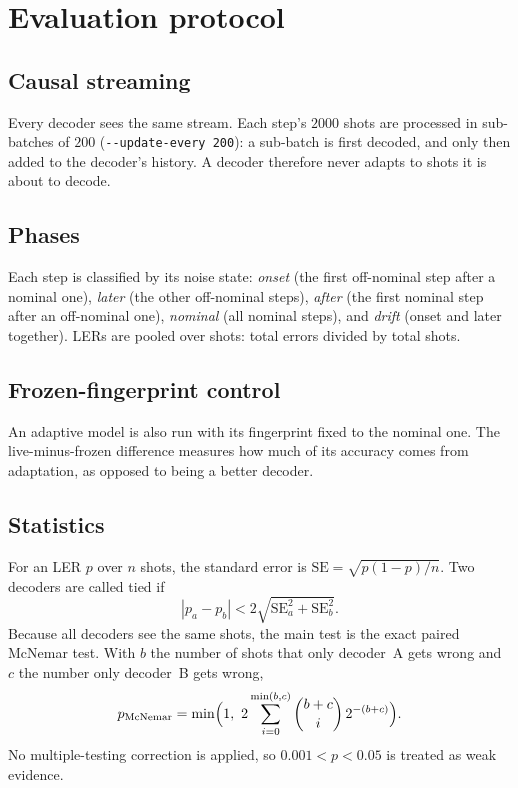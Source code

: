 \documentclass[11pt,a4paper]{article}
\newcommand{\code}[1]{\texttt{#1}}
\begin{document}
\section{Evaluation protocol}\label{sec:eval}

\subsection{Causal streaming}
Every decoder sees the same stream. Each step's $2000$ shots are processed in sub-batches of $200$
(\code{-{}-update-every 200}): a sub-batch is first decoded, and only then added to the decoder's history.
A decoder therefore never adapts to shots it is about to decode.

\subsection{Phases}
Each step is classified by its noise state:
\emph{onset} (the first off-nominal step after a nominal one),
\emph{later} (the other off-nominal steps),
\emph{after} (the first nominal step after an off-nominal one),
\emph{nominal} (all nominal steps), and
\emph{drift} (onset and later together). LERs are pooled over shots: total errors divided by total shots.

\subsection{Frozen-fingerprint control}
An adaptive model is also run with its fingerprint fixed to the nominal one. The live-minus-frozen difference
measures how much of its accuracy comes from adaptation, as opposed to being a better decoder.

\subsection{Statistics}
For an LER $p$ over $n$ shots, the standard error is $\mathrm{SE} = \sqrt{p(1-p)/n}$.
Two decoders are called tied if
\begin{equation}
  |p_a - p_b| < 2\sqrt{\mathrm{SE}_a^2 + \mathrm{SE}_b^2}.
\end{equation}
Because all decoders see the same shots, the main test is the exact paired McNemar test. With $b$ the number of
shots that only decoder~A gets wrong and $c$ the number only decoder~B gets wrong,
\begin{equation}
  p_{\text{McNemar}} = \min\Bigl(1,\ 2\sum_{i=0}^{\min(b,c)}\binom{b+c}{i}\,2^{-(b+c)}\Bigr).
\end{equation}
No multiple-testing correction is applied, so $0.001 < p < 0.05$ is treated as weak evidence.
\end{document}
